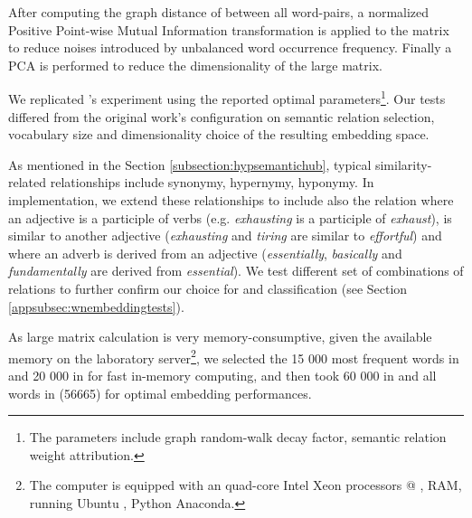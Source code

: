 After computing the graph distance of between all word-pairs, a normalized Positive Point-wise Mutual Information transformation is applied to the matrix to reduce noises introduced by unbalanced word occurrence frequency. Finally a PCA is performed to reduce the dimensionality of the large matrix. 

We replicated \citeauthor{saediWordNetEmbeddings2018}'s experiment using the reported optimal parameters\footnote{The parameters include graph random-walk decay factor, semantic relation weight attribution.}. Our tests differed from the original work's configuration on semantic relation selection, vocabulary size and dimensionality choice of the resulting embedding space. 

As mentioned in the Section \ref{subsection:hypsemantichub}, typical similarity-related relationships include synonymy, hypernymy, hyponymy. In  implementation, we extend these relationships to include also the relation where an adjective is a participle of verbs (e.g. \emph{exhausting} is a participle of \emph{exhaust}), is similar to another adjective (\emph{exhausting} and \emph{tiring} are similar to \emph{effortful}) and where an adverb is derived from an adjective (\emph{essentially}, \emph{basically} and \emph{fundamentally} are derived from \emph{essential}). We test different set of combinations of relations to further confirm our choice for \similarity and \association classification (see Section \ref{appsubsec:wnembeddingtests}).

As large matrix calculation is very memory-consumptive, given the available memory on the laboratory server\footnote{The computer is equipped with an quad-core Intel Xeon processors @ ,  RAM, running Ubuntu , Python  Anaconda.}, we selected the 15 000 most frequent words in  and 20 000 in  for fast in-memory computing, and then took 60 000 in  and all words in  (56665) for optimal embedding performances. 

